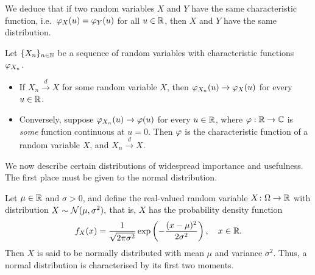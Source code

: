 We deduce that if two random variables $X$ and $Y$ have the same characteristic function, i.e.\ $\varphi_X(u) = \varphi_Y(u)$ for all $u \in \mathbb{R}$, then $X$ and $Y$ have the same distribution.

\begin{theorem}\label{theorem:LevyContinuity}
Let $\{X_n\}_{n \in \mathbb{N}}$ be a sequence of random variables with characteristic functions $\varphi_{X_n}$.
\begin{itemize}
  \item If $X_n \xrightarrow{d} X$ for some random variable $X$, then $\varphi_{X_n}(u) \to \varphi_X(u)$ for every $u \in \mathbb{R}$.
  \item Conversely, suppose $\varphi_{X_n}(u) \to \varphi(u)$ for every $u \in \mathbb{R}$, where $\varphi : \mathbb{R}\to\mathbb{C}$ is \emph{some} function continuous at $u=0$. Then $\varphi$ is the characteristic function of a random variable $X$, and $X_n \xrightarrow{d} X$. \qedopentext
\end{itemize}
\end{theorem}


We now describe certain distributions of widespread importance and usefulness. The first place must be given to the normal distribution.

\medskip

\begin{example}
Let $\mu \in \mathbb{R}$ and $\sigma > 0$, and define the real-valued random variable $X \colon \Omega \to \mathbb{R}$ with distribution $X \sim \mathcal{N}(\mu, \sigma^2),$
that is, $X$ has the probability density function
\begin{equation}
f_X(x) = \frac{1}{\sqrt{2\pi \sigma^2}} \exp\left( -\frac{(x - \mu)^2}{2\sigma^2} \right), \quad x \in \mathbb{R}.
\end{equation}
Then $X$ is said to be normally distributed with mean $\mu$ and variance $\sigma^2$. Thus, a normal distribution is characterised by its first two moments.
\end{example}

